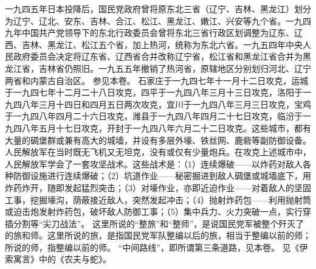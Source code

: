 \begin{maonote}
一九四五年日本投降后，国民党政府曾将原东北三省（辽宁、吉林、黑龙江）划分为辽宁、辽北、安东、吉林、合江、松江、黑龙江、嫩江、兴安等九个省。一九四九年中国共产党领导下的东北行政委员会曾将东北三省行政区划调整为辽东、辽西、吉林、黑龙江、松江五个省，加上热河，统称为东北六省。一九五四年中央人民政府委员会决定将辽东省、辽西省合并改称辽宁省，松江省和黑龙江省合并为黑龙江省，吉林省仍照旧。一九五五年撤销了热河省，原辖地区分别划归河北、辽宁两省和内蒙古自治区。
参见本卷。
石家庄于一九四七年十一月十二日攻克，运城于一九四七年十二月二十八日攻克，四平于一九四八年三月十三日攻克，洛阳于一九四八年三月十四日和四月五日两次攻克，宜川于一九四八年三月三日攻克，宝鸡于一九四八年四月二十六日攻克，潍县于一九四八年四月二十七日攻克，临汾于一九四八年五月十七日攻克，开封于一九四八年六月二十二日攻克。这些城市，都有大量的碉堡群或兼有高大的城墙，并设有多层外壕、铁丝网、鹿砦等副防御设备。人民解放军在当时既无飞机又无坦克，没有或仅有少量炮兵。在攻克上述城市中，人民解放军学会了一套攻坚战术。这些战术是：（1）连续爆破——以炸药对敌人各种防御设施进行连续爆破；（2）坑道作业——秘密掘进到敌人碉堡或城墙底下，用炸药炸开，随即发起猛烈突击；（3）对壕作业，亦即近迫作业——对着敌人的坚固工事，挖掘壕沟，荫蔽接近敌人，突然发起冲击；（4）抛射炸药包——利用抛射筒或迫击炮发射炸药包，破坏敌人防御工事；（5）集中兵力、火力突破一点，实行穿插分割等“尖刀战法”。
这里所说的“整旅”和“整师”，是说国民党军被整个歼灭了的旅和师。这里所说的旅，是指国民党军队整编以后的旅，相当于整编以前的师；所说的师，指整编以前的师。
“中间路线”，即所谓第三条道路，见本卷。
见《伊索寓言》中的《农夫与蛇》。
\end{maonote}
